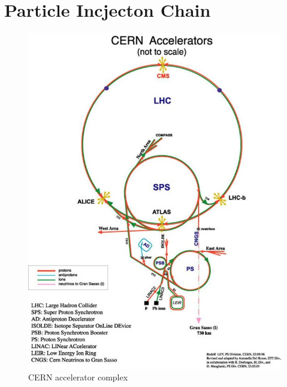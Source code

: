 \section{Particle Incjecton Chain} \label{sec:lhc:injection}

\begin{figure}[!htbp] 
  \begin{center}
    \includegraphics[width=0.9\linewidth]{figures/lhc/injection.jpg}
    \caption{ CERN accelerator complex} 
    \label{fig:injection_chain} 
  \end{center} 
\end{figure}

